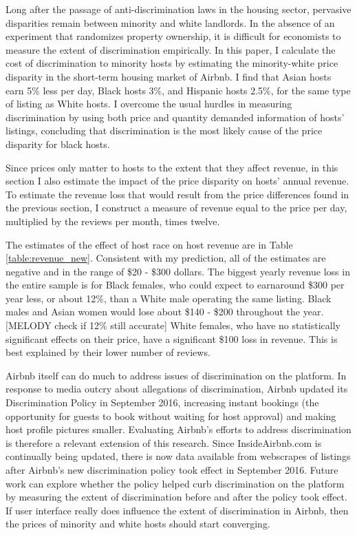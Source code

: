 
Long after the passage of anti-discrimination laws in the housing sector, pervasive disparities remain between minority and white landlords. In the absence of an experiment that randomizes property ownership, it is difficult for economists to measure the extent of discrimination empirically. In this paper, I calculate the cost of discrimination to minority hosts by estimating the minority-white price disparity in the short-term housing market of Airbnb. I find that Asian hosts earn 5\% less per day, Black hosts 3\%, and Hispanic hosts 2.5\%, for the same type of listing as White hosts. I overcome the usual hurdles in measuring discrimination by using both price and quantity demanded information of hosts' listings, concluding that discrimination is the most likely cause of the price disparity for black hosts. 

Since prices only matter to hosts to the extent that they affect revenue, in this section I also estimate the impact of the price disparity on hosts' annual revenue. To estimate the revenue loss that would result from the price differences found in the previous section, I construct a measure of revenue equal to the price per day, multiplied by the reviews per month, times twelve. 

The estimates of the effect of host race on host revenue are in Table \ref{table:revenue_new}. Consistent with my prediction, all of the estimates are negative and in the range of \$20 - \$300 dollars. The biggest yearly revenue loss in the entire sample is for Black females, who could expect to earnaround \$300 per year less, or about 12\%, than a White male operating the same listing. Black males and Asian women would lose about \$140 - \$200 throughout the year. [MELODY check if 12\% still accurate] White females, who have no statistically significant effects on their price, have a significant \$100 loss in revenue. This is best explained by their lower number of reviews. 

Airbnb itself can do much to address issues of discrimination on the platform. In response to media outcry about allegations of discrimination, Airbnb updated its Discrimination Policy in September 2016, increasing instant bookings (the opportunity for guests to book without waiting for host approval) and making host profile pictures smaller. Evaluating Airbnb's efforts to address discrimination is therefore a relevant extension of this research. Since InsideAirbnb.com is continually being updated, there is now data available from webscrapes of listings after Airbnb's new discrimination policy took effect in September 2016. Future work can explore whether the policy helped curb discrimination on the platform by measuring the extent of discrimination before and after the policy took effect. If user interface really does influence the extent of discrimination in Airbnb, then the prices of minority and white hosts should start converging. 
